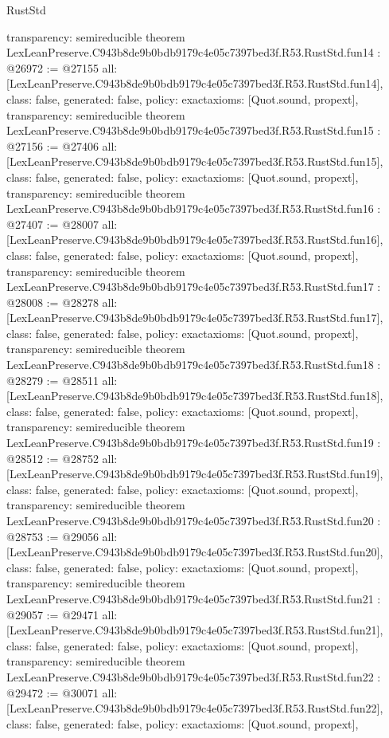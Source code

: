 \begin{lexlean}{RustStd}
\begin{coremodule}
{  transparency: semireducible
}
theorem LexLeanPreserve.C943b8de9b0bdb9179c4e05c7397bed3f.R53.RustStd.fun14 : @26972 := @27155 {
  all: [LexLeanPreserve.C943b8de9b0bdb9179c4e05c7397bed3f.R53.RustStd.fun14],
  class: false,
  generated: false,
  policy: exact{axioms: [Quot.sound, propext]},
  transparency: semireducible
}
theorem LexLeanPreserve.C943b8de9b0bdb9179c4e05c7397bed3f.R53.RustStd.fun15 : @27156 := @27406 {
  all: [LexLeanPreserve.C943b8de9b0bdb9179c4e05c7397bed3f.R53.RustStd.fun15],
  class: false,
  generated: false,
  policy: exact{axioms: [Quot.sound, propext]},
  transparency: semireducible
}
theorem LexLeanPreserve.C943b8de9b0bdb9179c4e05c7397bed3f.R53.RustStd.fun16 : @27407 := @28007 {
  all: [LexLeanPreserve.C943b8de9b0bdb9179c4e05c7397bed3f.R53.RustStd.fun16],
  class: false,
  generated: false,
  policy: exact{axioms: [Quot.sound, propext]},
  transparency: semireducible
}
theorem LexLeanPreserve.C943b8de9b0bdb9179c4e05c7397bed3f.R53.RustStd.fun17 : @28008 := @28278 {
  all: [LexLeanPreserve.C943b8de9b0bdb9179c4e05c7397bed3f.R53.RustStd.fun17],
  class: false,
  generated: false,
  policy: exact{axioms: [Quot.sound, propext]},
  transparency: semireducible
}
theorem LexLeanPreserve.C943b8de9b0bdb9179c4e05c7397bed3f.R53.RustStd.fun18 : @28279 := @28511 {
  all: [LexLeanPreserve.C943b8de9b0bdb9179c4e05c7397bed3f.R53.RustStd.fun18],
  class: false,
  generated: false,
  policy: exact{axioms: [Quot.sound, propext]},
  transparency: semireducible
}
theorem LexLeanPreserve.C943b8de9b0bdb9179c4e05c7397bed3f.R53.RustStd.fun19 : @28512 := @28752 {
  all: [LexLeanPreserve.C943b8de9b0bdb9179c4e05c7397bed3f.R53.RustStd.fun19],
  class: false,
  generated: false,
  policy: exact{axioms: [Quot.sound, propext]},
  transparency: semireducible
}
theorem LexLeanPreserve.C943b8de9b0bdb9179c4e05c7397bed3f.R53.RustStd.fun20 : @28753 := @29056 {
  all: [LexLeanPreserve.C943b8de9b0bdb9179c4e05c7397bed3f.R53.RustStd.fun20],
  class: false,
  generated: false,
  policy: exact{axioms: [Quot.sound, propext]},
  transparency: semireducible
}
theorem LexLeanPreserve.C943b8de9b0bdb9179c4e05c7397bed3f.R53.RustStd.fun21 : @29057 := @29471 {
  all: [LexLeanPreserve.C943b8de9b0bdb9179c4e05c7397bed3f.R53.RustStd.fun21],
  class: false,
  generated: false,
  policy: exact{axioms: [Quot.sound, propext]},
  transparency: semireducible
}
theorem LexLeanPreserve.C943b8de9b0bdb9179c4e05c7397bed3f.R53.RustStd.fun22 : @29472 := @30071 {
  all: [LexLeanPreserve.C943b8de9b0bdb9179c4e05c7397bed3f.R53.RustStd.fun22],
  class: false,
  generated: false,
  policy: exact{axioms: [Quot.sound, propext]},
}
\end{coremodule}
\end{lexlean}
